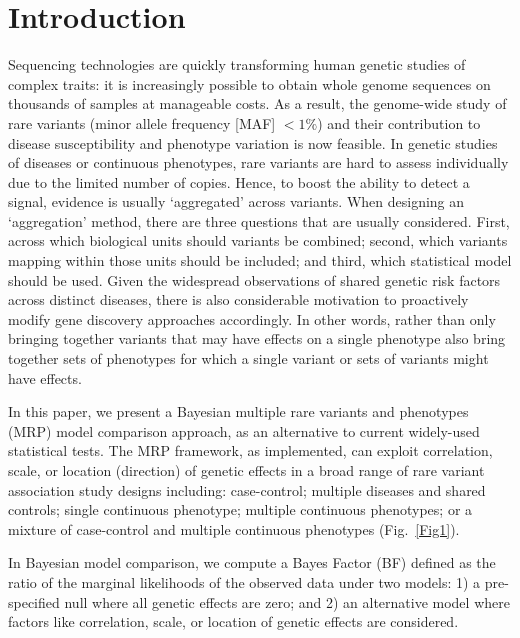 \documentclass{nature}
\begin{document}
\section{Introduction} 
Sequencing technologies are quickly transforming human genetic studies of complex traits: it is increasingly possible to obtain whole genome sequences on thousands of samples at manageable costs. As a result, the genome-wide study of rare variants (minor allele frequency [MAF] $< 1\%$) and their contribution to disease susceptibility and phenotype variation is now feasible\cite{ifih1,altshuler2010map,rivas2011deep,10002012integrated}. 
In genetic studies of diseases or continuous phenotypes, rare variants are hard to assess individually due to the limited number of copies. Hence, to boost the ability to detect a signal, evidence is usually `aggregated' across variants. When designing an `aggregation' method, there are three questions that are usually considered. First, across which biological units should variants be combined; second, which variants mapping within those units should be included\cite{majithia2014rare}; and third, which statistical model should be used\cite{lee2014rare}. Given the widespread observations of shared genetic risk factors across distinct diseases, there is also considerable motivation to proactively modify gene discovery approaches accordingly. In other words, rather than only bringing together variants that may have effects on a single phenotype also bring together sets of phenotypes for which a single variant or sets of variants might have effects. 

In this paper, we present a Bayesian multiple rare variants and phenotypes (MRP) model comparison approach, as an alternative to current widely-used statistical tests. The MRP framework, as implemented, can exploit correlation, scale, or location (direction) of genetic effects in a broad range of rare variant association study designs including: case-control; multiple diseases and shared controls; single continuous phenotype; multiple continuous phenotypes; or a mixture of case-control and multiple continuous phenotypes (Fig.~\ref{Fig1}). 

In Bayesian model comparison, we compute a Bayes Factor (BF) defined as the ratio of the marginal likelihoods of the observed data under two models: 1) a pre-specified null where all genetic effects are zero; and 2) an alternative model where factors like correlation, scale, or location of genetic effects are considered. 
\end{document}
